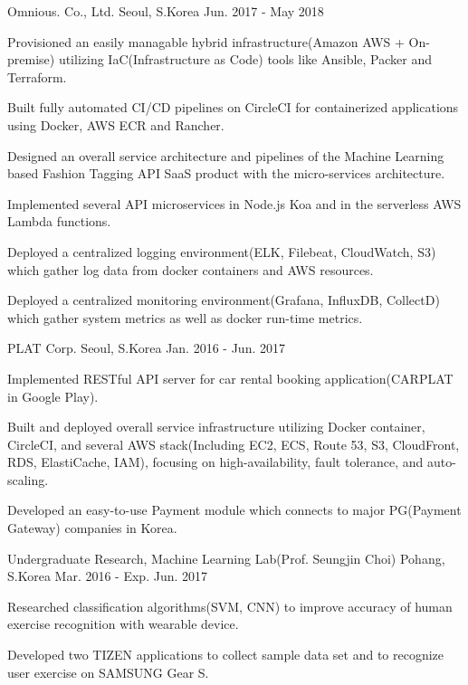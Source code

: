 \begin{cventries}
	{Omnious. Co., Ltd.} %
	{Seoul, S.Korea} %
	{Jun. 2017 - May 2018} %
	{
		\begin{cvitems} %
			\item {Provisioned an easily managable hybrid infrastructure(Amazon AWS + On-premise) utilizing IaC(Infrastructure as Code) tools like Ansible, Packer and Terraform.}
			\item {Built fully automated CI/CD pipelines on CircleCI for containerized applications using Docker, AWS ECR and Rancher.}
			\item {Designed an overall service architecture and pipelines of the Machine Learning based Fashion Tagging API SaaS product with the micro-services architecture.}
			\item {Implemented several API microservices in Node.js Koa and in the serverless AWS Lambda functions.}
			\item {Deployed a centralized logging environment(ELK, Filebeat, CloudWatch, S3) which gather log data from docker containers and AWS resources.}
			\item {Deployed a centralized monitoring environment(Grafana, InfluxDB, CollectD) which gather system metrics as well as docker run-time metrics.}
		\end{cvitems}
	}

	{PLAT Corp.} %
	{Seoul, S.Korea} %
	{Jan. 2016 - Jun. 2017} %
	{
		\begin{cvitems} %
			\item {Implemented RESTful API server for car rental booking application(CARPLAT in Google Play).}
			\item {Built and deployed overall service infrastructure utilizing Docker container, CircleCI, and several AWS stack(Including EC2, ECS, Route 53, S3, CloudFront, RDS, ElastiCache, IAM), focusing on high-availability, fault tolerance, and auto-scaling.}
			\item {Developed an easy-to-use Payment module which connects to major PG(Payment Gateway) companies in Korea.}
		\end{cvitems}
	}

	{Undergraduate Research, Machine Learning Lab(Prof. Seungjin Choi)} %
	{Pohang, S.Korea} %
	{Mar. 2016 - Exp. Jun. 2017} %
	{
		\begin{cvitems} %
			\item {Researched classification algorithms(SVM, CNN) to improve accuracy of human exercise recognition with wearable device.}
			\item {Developed two TIZEN applications to collect sample data set and to recognize user exercise on SAMSUNG Gear S.}
		\end{cvitems}
	}


\end{cventries}
